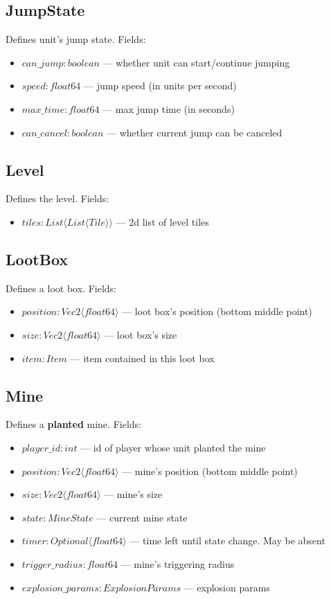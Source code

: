 \subsection{JumpState}
Defines unit's jump state. Fields:
\begin{itemize}
    \item $can\_jump : boolean$ --- whether unit can start/continue jumping
    \item $speed : float64$ --- jump speed (in units per second)
    \item $max\_time : float64$ --- max jump time (in seconds)
    \item $can\_cancel : boolean$ --- whether current jump can be canceled
\end{itemize}

\subsection{Level}
Defines the level. Fields:
\begin{itemize}
    \item $tiles : List \langle List \langle Tile \rangle \rangle$ --- 2d list of level tiles
\end{itemize}

\subsection{LootBox}
Defines a loot box. Fields:
\begin{itemize}
    \item $position : Vec2 \langle float64 \rangle$ --- loot box's position (bottom middle point)
    \item $size : Vec2 \langle float64 \rangle$ --- loot box's size
    \item $item : Item$ --- item contained in this loot box
\end{itemize}

\subsection{Mine}
Defines a \textbf{planted} mine. Fields:
\begin{itemize}
    \item $player\_id : int$ --- id of player whose unit planted the mine
    \item $position : Vec2 \langle float64 \rangle$ --- mine's position (bottom middle point)
    \item $size : Vec2 \langle float64 \rangle$ --- mine's size
    \item $state : MineState$ --- current mine state
    \item $timer : Optional \langle float64 \rangle$ --- time left until state change. May be absent
    \item $trigger\_radius : float64$ --- mine's triggering radius
    \item $explosion\_params : ExplosionParams$ --- explosion params
\end{itemize}

